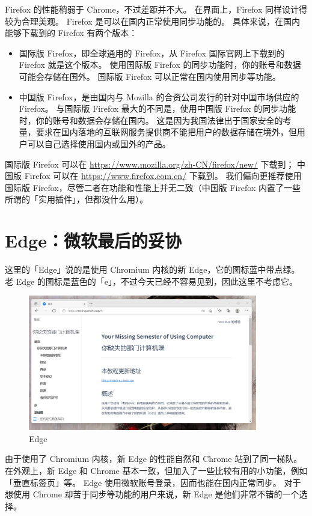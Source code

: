Firefox 的性能稍弱于 Chrome，不过差距并不大。
在界面上，Firefox 同样设计得较为合理美观。
Firefox 是可以在国内正常使用同步功能的。
具体来说，在国内能够下载到的 Firefox 有两个版本：

\begin{itemize}
  \item 国际版 Firefox，即全球通用的 Firefox，从 Firefox 国际官网上下载到的 Firefox 就是这个版本。
    使用国际版 Firefox 的同步功能时，你的账号和数据可能会存储在国外。
    国际版 Firefox 可以正常在国内使用同步等功能。
  \item 中国版 Firefox，是由国内与 Mozilla 的合资公司发行的针对中国市场供应的 Firefox。
    与国际版 Firefox 最大的不同是，使用中国版 Firefox 的同步功能时，你的账号和数据会存储在国内。
    这是因为我国法律出于国家安全的考量，要求在国内落地的互联网服务提供商不能把用户的数据存储在境外，但用户可以自己选择使用国内或国外的产品。
\end{itemize}

国际版 Firefox 可以在 \url{https://www.mozilla.org/zh-CN/firefox/new/} 下载到；
中国版 Firefox 可以在 \url{https://www.firefox.com.cn/} 下载到。
我们偏向更推荐使用国际版 Firefox，尽管二者在功能和性能上并无二致（中国版 Firefox 内置了一些所谓的「实用插件」，但都没什么用）。

\section{Edge：微软最后的妥协}

这里的「Edge」说的是使用 Chromium 内核的新 Edge，它的图标蓝中带点绿。
老 Edge 的图标是蓝色的「e」，不过今天已经不容易见到，因此这里不考虑它。

\begin{figure}[htb!]
  \centering
  \includegraphics[width=10cm]{assets/Edge.png}
  \caption{Edge}
  \label{Edge}
\end{figure}

由于使用了 Chromium 内核，新 Edge 的性能自然和 Chrome 站到了同一梯队。
在外观上，新 Edge 和 Chrome 基本一致，但加入了一些比较有用的小功能，例如「垂直标签页」等。
Edge 使用微软账号登录，因而也能在国内正常同步。
对于想使用 Chrome 却苦于同步等功能的用户来说，新 Edge 是他们非常不错的一个选择。


